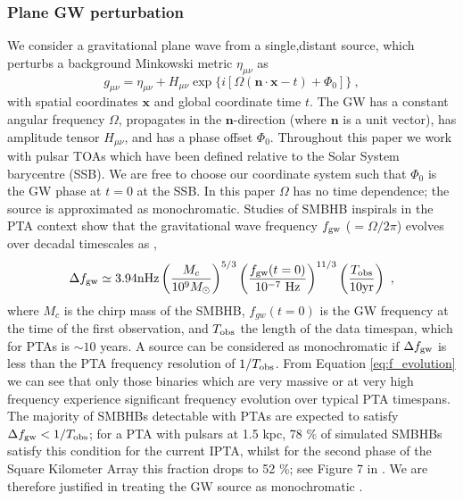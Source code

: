 \documentclass[fleqn,usenatbib,useAMS]{mnras}
\begin{document}
\subsubsection{Plane GW perturbation}\label{sec:plane_gw}
We consider a gravitational plane wave from a single,distant source, which perturbs a background Minkowski metric $\eta_{\mu \nu}$ as
\begin{equation}
	g_{\mu \nu} = \eta_{\mu \nu} + H_{\mu \nu} \exp{ \{ i[\Omega(\boldsymbol{n} \cdot \boldsymbol{x} - t) + \Phi_0] \} } \ ,
\end{equation}
with spatial coordinates $\boldsymbol{x}$ and global coordinate time $t$. The GW has a constant angular frequency $\Omega$, propagates in the $\boldsymbol{n}$-direction (where $\boldsymbol{n}$ is a unit vector), has amplitude tensor $H_{\mu \nu}$, and has a phase offset  $\Phi_0$. Throughout this paper we work with pulsar TOAs which have been defined relative to the Solar System barycentre (SSB). We are free to choose our coordinate system such that $\Phi_0$ is the GW phase at $t=0$ at the SSB. In this paper $\Omega$ has no time dependence; the source is approximated as monochromatic. Studies of SMBHB inspirals in the PTA context show that the gravitational wave frequency $f_{\rm gw}$ ($=\Omega / 2 \pi $) evolves over decadal timescales as \citep[e.g.][]{Zhu10},
\begin{equation}
	\Delta f_{\rm gw} \simeq 3.94 \mathrm{nHz}\left(\frac{M_c}{10^9 M_{\odot}}\right)^{5 / 3}\left(\frac{f_{\rm gw}(t=0)}{10^{-7} \mathrm{~Hz}}\right)^{11 / 3}\left(\frac{T_{\mathrm{obs}}}{10 \mathrm{yr}}\right) \ ,
	\label{eq:f_evolution}
\end{equation}
where $M_c$ is the chirp mass of the SMBHB, $f_{gw}(t=0)$ is the GW frequency at the time of the first observation, and $T_{\rm obs}$ the length of the data timespan, which for PTAs is $\sim 10$ years. A source can be considered as monochromatic if $\Delta f_{\rm gw}$ is less than the PTA frequency resolution of $1/T_{\rm obs}$. From Equation \eqref{eq:f_evolution} we can see that only those binaries which are very massive or at very high frequency experience significant frequency evolution over typical PTA timespans. The majority of SMBHBs detectable with PTAs are expected to satisfy $\Delta f_{\rm gw} < 1/T_{\rm obs}$; for a PTA with pulsars at 1.5 kpc, 78 \% of simulated SMBHBs satisfy this condition for the current IPTA, whilst for the second phase of the Square Kilometer Array this fraction drops to 52 \%; see Figure 7 in  \cite{Rosado10.1093/mnras/stv1098}. We are therefore justified in treating the GW source as monochromatic \citep{Sesana10,Sesana2010,Ellis2012ApJ}. \newline 
\end{document}

